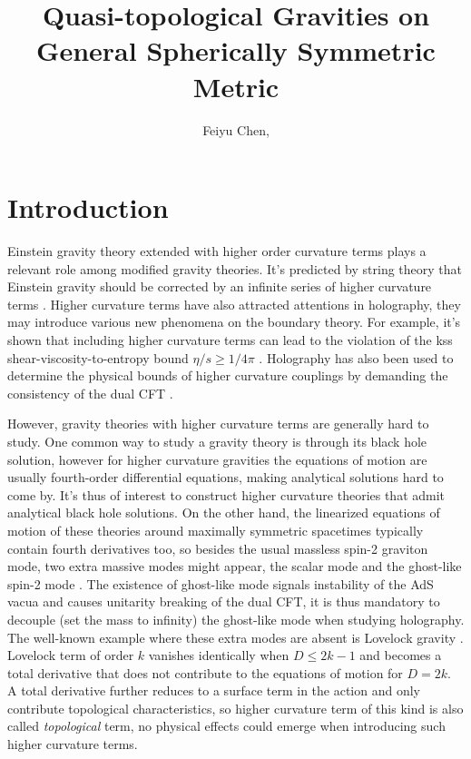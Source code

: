 \documentclass[a4paper,11pt]{article}
\title{\boldmath Quasi-topological Gravities on General Spherically Symmetric Metric}
\author[a,b,1]{Feiyu Chen,\note{Corresponding author.}}
\affiliation[a]{Institute of High Energy Physics, Chinese Academy of Sciences, \\Beijing 100049, P.R. China}
\affiliation[b]{School of Physics, University of Chinese Academy of Sciences, \\Beijing 100049, P.R. China}
\begin{document}
 
\maketitle
\flushbottom

\section{Introduction}
\label{sec:intro}
Einstein gravity theory extended with higher order curvature terms plays a relevant role among modified gravity theories. It's predicted by string theory that Einstein gravity should be corrected by an infinite series of higher curvature terms \cite{quartic-heterotic-eft, sigma-ss-eft}. Higher curvature terms have also attracted attentions in holography, they may introduce various new phenomena on the boundary theory. For example, it's shown that including higher curvature terms can lead to the violation of the \ac{kss} shear-viscosity-to-entropy bound $\eta / s \geqslant 1/4\pi$ \cite{kss-bound, holographic-gb, holographic-qtg3}. Holography has also been used to determine the physical bounds of higher curvature couplings by demanding the consistency of the dual CFT \cite{gb-causality, lovelock-causality, holographic-qtg3}.

However, gravity theories with higher curvature terms are generally hard to study. One common way to study a gravity theory is through its black hole solution, however for higher curvature gravities the equations of motion are usually fourth-order differential equations, making analytical solutions hard to come by. It's thus of interest to construct higher curvature theories that admit analytical black hole solutions. On the other hand, the linearized equations of motion of these theories around maximally symmetric spacetimes typically contain fourth derivatives too, so besides the usual massless spin-2 graviton mode, two extra massive modes might appear, the scalar mode and the ghost-like spin-2 mode \cite{general-hogr}. The existence of ghost-like mode signals instability of the AdS vacua and causes unitarity breaking of the dual CFT, it is thus mandatory to decouple (set the mass to infinity) the ghost-like mode when studying holography. The well-known example where these extra modes are absent is Lovelock gravity \cite{lovelock-th, lovelock-2}. Lovelock term of order $k$ vanishes identically when $D \leqslant 2k - 1$ and becomes a total derivative that does not contribute to the equations of motion for $D = 2k$. A total derivative further reduces to a surface term in the action and only contribute topological characteristics, so higher curvature term of this kind is also called \textit{topological} term, no physical effects could emerge when introducing such higher curvature terms.
\end{document}
